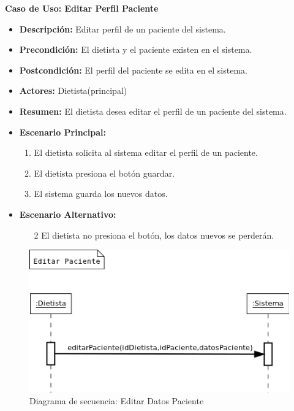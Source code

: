 \textbf{Caso de Uso: Editar Perfil Paciente}
\begin{itemize}
\item \textbf{Descripción:} Editar perfil de un paciente del sistema.
\item \textbf{Precondición:} El dietista y el paciente existen en el sistema.
\item \textbf{Postcondición:} El perfil del paciente se edita en el sistema.
\item \textbf{Actores:} Dietista(principal)
\item \textbf{Resumen:} El dietista desea editar el perfil de un paciente del sistema.
\item \textbf{Escenario Principal:}
\begin{enumerate}
\item El dietista solicita al sistema editar el perfil de un paciente.
\item El dietista presiona el botón guardar.
\item El sistema guarda los nuevos datos.
\end{enumerate}
\item \textbf{Escenario Alternativo:}
\begin{enumerate}
\item[2] El dietista no presiona el botón, los datos nuevos se perderán.
\end{enumerate}
\end{itemize}
\begin{figure}[H]
  \label{ds_editarpaciente}
  \begin{center}
    \includegraphics[scale=0.7]{../img/DS_EditarPaciente.png}
  \end{center}
  \caption{Diagrama de secuencia: Editar Datos Paciente}
\end{figure}
